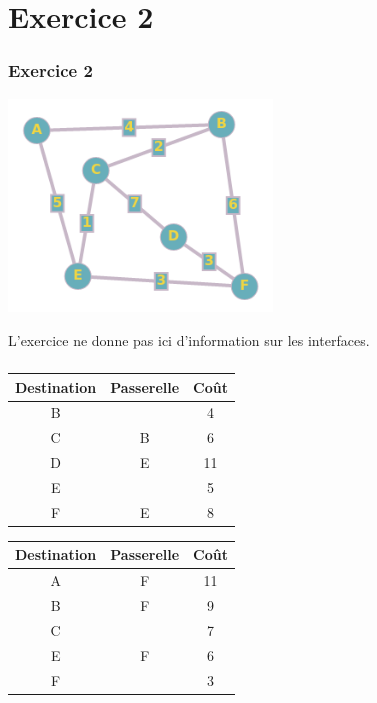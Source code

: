 \documentclass[svgnames,11pt]{beamer}
\begin{document}
\section{Exercice 2}
\begin{frame}
    \frametitle{Exercice 2}
    \begin{center}
        \centering
        \includegraphics[width=7cm]{ressources/exo2.png}
        \label{IMG}
        \end{center}
        L'exercice ne donne pas ici d'information sur les interfaces.
    

\end{frame}
\begin{frame}
    \frametitle{}

    \begin{center}
        \begin{tabular}{|*{3}{c|}}
            \hline
            Destination & Passerelle & Coût \\
            \hline
            B &  &  4 \\
            \hline
            C & B & 6 \\
            \hline
            D & E & 11 \\
            \hline
            E &   & 5 \\
            \hline
            F & E & 8 \\
            \hline
        \end{tabular}
    \end{center}
    \begin{center}
        \begin{tabular}{|*{3}{c|}}
            \hline
            Destination & Passerelle & Coût \\
            \hline
            A & F & 11 \\
            \hline
            B & F &  9 \\
            \hline
            C &  & 7 \\
            \hline
            E &  F & 6 \\
            \hline
            F &  & 3 \\
            \hline
        \end{tabular}
    \end{center}

\end{frame}
\end{document}
